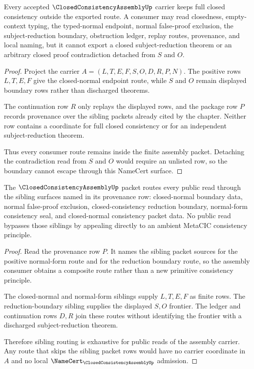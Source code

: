 \begin{theorem}
\label{thm:closed-consistency-assembly-boundary-nonescape}
Every accepted $\ClosedConsistencyAssemblyUp$ carrier keeps full closed consistency outside the exported route. A consumer may read closedness, empty-context typing, the typed-normal endpoint, normal false-proof exclusion, the subject-reduction boundary, obstruction ledger, replay routes, provenance, and local naming, but it cannot export a closed subject-reduction theorem or an arbitrary closed proof contradiction detached from $S$ and $O$.
\end{theorem}
\begin{proof}
Project the carrier $A=(L,T,E,F,S,O,D,R,P,N)$. The positive rows $L,T,E,F$ give the closed-normal endpoint route, while $S$ and $O$ remain displayed boundary rows rather than discharged theorems.

The continuation row $R$ only replays the displayed rows, and the package row $P$ records provenance over the sibling packets already cited by the chapter. Neither row contains a coordinate for full closed consistency or for an independent subject-reduction theorem.

Thus every consumer route remains inside the finite assembly packet. Detaching the contradiction read from $S$ and $O$ would require an unlisted row, so the boundary cannot escape through this NameCert surface.
\end{proof}

\begin{theorem}
\label{thm:closed-consistency-assembly-sibling-routing}
The $\ClosedConsistencyAssemblyUp$ packet routes every public read through the sibling surfaces named in its provenance row: closed-normal boundary data, normal false-proof exclusion, closed-consistency reduction boundary, normal-form consistency seal, and closed-normal consistency packet data. No public read bypasses those siblings by appealing directly to an ambient MetaCIC consistency principle.
\end{theorem}
\begin{proof}
Read the provenance row $P$. It names the sibling packet sources for the positive normal-form route and for the reduction boundary route, so the assembly consumer obtains a composite route rather than a new primitive consistency principle.

The closed-normal and normal-form siblings supply $L,T,E,F$ as finite rows. The reduction-boundary sibling supplies the displayed $S,O$ frontier. The ledger and continuation rows $D,R$ join these routes without identifying the frontier with a discharged subject-reduction theorem.

Therefore sibling routing is exhaustive for public reads of the assembly carrier. Any route that skips the sibling packet rows would have no carrier coordinate in $A$ and no local $\NameCert_{\ClosedConsistencyAssemblyUp}$ admission.
\end{proof}

